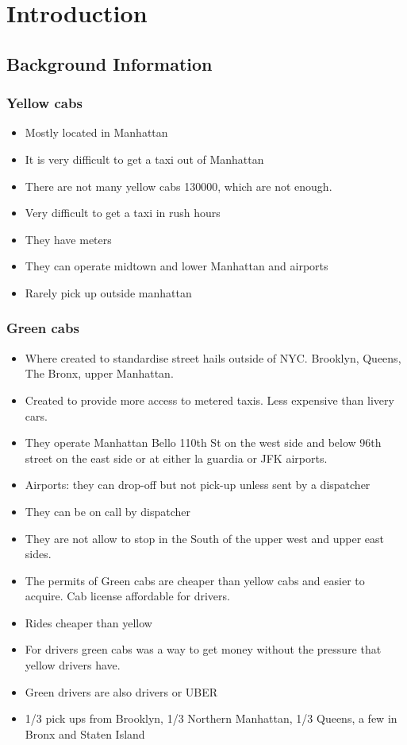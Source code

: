 \section{Introduction}


\subsection{Background Information}

\subsubsection{Yellow cabs}

\begin{itemize}
\item Mostly located in Manhattan
\item It is very difficult to get a taxi out of Manhattan
\item There are not many yellow cabs 130000, which are not enough.
\item Very difficult to get a taxi in rush hours
\item They have meters
\item They can operate midtown and lower Manhattan and airports
\item Rarely pick up outside manhattan


\end{itemize}


\subsubsection{Green cabs}

\begin{itemize}
\item Where created to standardise street hails outside of NYC. Brooklyn, Queens, The Bronx, upper Manhattan. 
\item Created to provide more access to metered taxis. Less expensive than livery cars.
\item They operate Manhattan Bello 110th St on the west side and below 96th street on the east side or at either la guardia or JFK airports.

\item Airports: they can drop-off but not pick-up unless sent by a dispatcher
\item They can be on call by dispatcher
\item They are not allow to stop in the South of the upper west and upper east sides.
\item The permits of Green cabs are cheaper than yellow cabs and easier to acquire. Cab license affordable for drivers.
\item Rides cheaper than yellow
\item For drivers green cabs was a way to get money without the pressure that yellow drivers have.
\item Green drivers are also drivers or UBER
\item 1/3 pick ups from Brooklyn,  1/3 Northern Manhattan, 1/3 Queens, a few in Bronx and Staten Island

\end{itemize}

